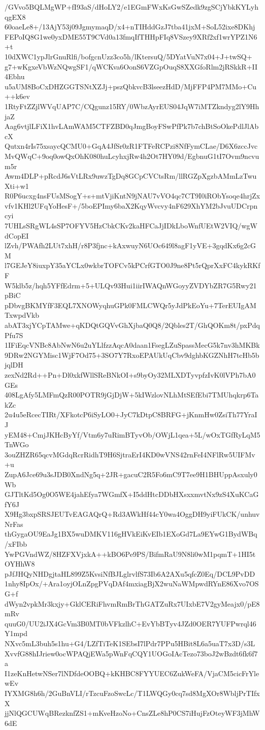 /GVvo5BQLMgWP+fI93aS/dHoLY2/e1EGmFWxKsGwSZedk9zgSCjYbkKYLyhqgEX8
60oaeLe8+/13AjY53j09JgmymaqD/x4+nTIHddGzJ7tba41jxM+SoL52ixe8DKhj
FEPoIQ8G1we0yxDME55T9CVd0a13fmqIfTHHpFIq8VSzey9XRf2xf1wrYPZ1N6+t
10dXWC1ypJlrGnuRlfi/bofgcnUzz3co5h/lKtersuQ/5DYatVuN7x04+J+twSQ+
g7+wKgxeVbWzNQwgSF1/qWCKva6OonS6VZGpOuqS8XXGfoRlm2jRSkkR+II4Ebhu
u5aUM8BoCxDHZGGTSNtXZJj+pszQbkvcB3lseezHdD/MjFFP4PM7MMo+Cu++k6ev
1RtyFtZZjlWVqUAP7C/CQgunz15RY/0WbzAyrEUS04JqW7iMTZkndyg2lY9HhjaZ
Aag6vtjlLFiX1hvLAmWAM5CTFZBD0qJmgBoyFSwPfPk7b7chBtSoOkePdlJlAbcX
Qutxn4rIs75xsaycQCMU0+GqA4JfSr0zR1FTFeRCPzi8NfFymCLae/D6X6zccJvc
MvQWqC+9oq0owQxOhK080huLcyhxjRw4h2Ot7HY09d/EgbnuG1tI7Ovm9ncvum5r
Awm4DLP+pRcdJ6sVtLRx9uwzTgDq8GCpCVCtsRm/llRGZpXgzbAMmLzTwuXti+w1
R0P6ucxg4nsFUsMSogY+s+mtVjiKntN9jNAU7vVO4qc7CT9I0iRObYsoqe4hrjZx
vfv1KHl2UFqYoHesF+/5boEPImy6baX2KqyWvcvy4nF629XhYM2bJvuUDCrpncyi
7UHLsSRgWL4sSP7OFYV5HzCbkCKv2kaHFCaJjIDkLboWnfUEtW2VIQ/wgWdCopEI
lZvh/PWAfh2LUt7xhH/r8P3fjnc+kAxwuyN6UOc649l8agF1yVE+3gqdKx6g2cGM
l7GEJeY8iuxpY35aYCLx0wkbrTOFCv5kPCrfGTO0J9ne8Pt5rQprXxFC4kykRKfF
W5klb5z/hqh5YFfEdrm+5+ULQv93Hui1iirIWAQnWGoyyZVDYbZR7G5Rwy21pBiC
pDbvgBKMYfF3EQL7XNOWyqhuGPk0FMLCWQr5yJdPkEoYu+7TerEUIgAMTxwpdVkb
abAT3xjYCpTAMwe+qKDQtGQVvGhXjbaQ0Q8/2Qbles2T/GhQOKm8t/pxPdqPfu7S
1IFiEqcVNBc8AbNwN6u2uYLlfzzAqcA0daan1FsegLZuSpassMecG5k7nv3hMKBk
9DRw2NGYMisc1WjF7Od75+3SO7Y7RxoEPAUkUqCbv9dghbKGZNhH7tcHb5bjqlDH
zexNd2Rd++Pn+Dl0xkfWllSReBNkOI+s9byOy32MLXDTyvpfzIvK0lVPh7bA0GEs
408LgAfy5LMFmQzR00POTR9jGjDjW+5kIWzlovNLhMtSEfEbi7TMUhqkrp6TakZc
2u4u5eRcecTIRt/XFkotcP6iSyLO0+JyC7kDtpC8BRFG+jKnmHw0ZsiTh77YraIJ
yEM48+CmjJKHcByYf/Vtm6y7uRimBTyvOb/OWjL1qea+5L/wOxTGfRyLqM5TnWGo
3ouZHZR65qcvMGdqRcrRidhT9H6SjtraErI4KD0wVNS42rnFeI4NFlRw5UIFMv+u
ZupA6Jce69u3sJDB0XndNg5q+2JR+gacuC2R5Fo6mC9T7ee9H1BHUppAsxuly0Wb
GJTltKd5Og0O5WE4jahEfya7WGmfX+I5ddHtcDDbHXsxxmvtNx9zS4XuKCaGfY6J
X9Hg3bxpSRSJEUTvEAGAQrQ+Rd3AWkHf44cY0wa4OggDH9yiFUkCK/unhuvNrFas
thGygaOU9EaJg1BX5wuDMKV116gHVkEiKvEIb1EXoGd7La9EYwG1BydWBq/xFIbb
YwPGVndWZ/8HZFXVjxkA++kBO6Pe9PS/BifmRaU9N8li0wM1pqmT+1HI5tOYHhW8
pJfJHQyNHDgjtaHL899Z5KvsiNfBJLglrvlfS73Ib6A2AXu5qfcZ0Eq/DCL9PvDD
1nhy8IpOx/+Ara1oyjOLnZpgPVqDAf4mxiagBjX2wuNaWMpwdRYnE86Xvo7OSG+f
dWyn2vpkMr3kxjy+GklCERiFhvmRmBrThGATZuRx7UIxbE7V2gyMeajx0/pE8mRv
quuG0/UU2iJX4GcVm3B0MT0bVFkzlhC+EvYbBTyv4JZd0OER7YUFPwrql46Y1mpd
NXvc5mL3buh5s1hu+G4/LZfTiTeK1SEbsI7lPdr7PPu5HBit8L6a5uaT7x3D/s3L
XvvfG88hIJriew0ocWPAQjEWa5pWnFqCQY1UOGoIAcTezo73boJ2wBzdt6fk6f7a
I1zeKnHetwNSer7lNDfdeOOBQ+kKHBC8FYYUEC6ZukWeFA/VjaCM5cicFrYlewEv
IYXMG8h6h/2GuBnVLI/rTzcuFzoSwcLc/T1LWQGy0cq7sd8MgXOr8WbljPrTIfxX
jjNlQGCUWqBRezknfZS1+mKveHzoNo+CnsZLe8hP0CS7iHujFzOteyWF3jMhW6dE
